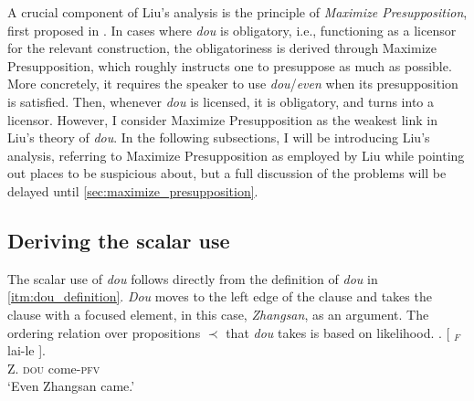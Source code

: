 \documentclass[12pt]{article}
\begin{document}
A crucial component of Liu's analysis is the principle of \emph{Maximize Presupposition}, first proposed in \citet{heimArtikelUndDefinitheit1991}.
In cases where \emph{dou} is obligatory, i.e., functioning as a licensor for the relevant construction, the obligatoriness is derived through Maximize Presupposition, which roughly instructs one to presuppose as much as possible.
More concretely, it requires the speaker to use \emph{dou}/\emph{even} when its presupposition is satisfied.
Then, whenever \emph{dou} is licensed, it is obligatory, and turns into a licensor.
However, I consider Maximize Presupposition as the weakest link in Liu's theory of \emph{dou}.
In the following subsections, I will be introducing Liu's analysis, referring to Maximize Presupposition as employed by Liu while pointing out places to be suspicious about, but a full discussion of the problems will be delayed until \cref{sec:maximize_presupposition}.


\subsection{Deriving the scalar use}
\label{sub:deriving_the_scalar_use}

The scalar use of \emph{dou} follows directly from the definition of \emph{dou} in \cref{itm:dou_definition}.
\emph{Dou} moves to the left edge of the clause and takes the clause with a focused element, in this case, \emph{Zhangsan}, as an argument.
The ordering relation over propositions \(\prec\) that \emph{dou} takes is based on likelihood.
\vspace{2.5em}
\ex. \gll
{} [ \(_F\)  lai-le ]. \\
{} {} Z. \textsc{dou} come-\textsc{pfv} \\
\glt `Even Zhangsan came.'
\end{document}
